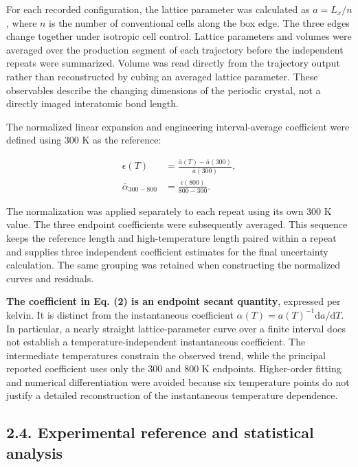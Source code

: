 \documentclass[10pt,a4paper,twocolumn]{article}
\begin{document}
For each recorded configuration, the lattice parameter was calculated as $a=L_x/n$, where $n$ is the number of conventional cells along the box edge. The three edges change together under isotropic cell control. Lattice parameters and volumes were averaged over the production segment of each trajectory before the independent repeats were summarized. Volume was read directly from the trajectory output rather than reconstructed by cubing an averaged lattice parameter. These observables describe the changing dimensions of the periodic crystal, not a directly imaged interatomic bond length.


The normalized linear expansion and engineering interval-average coefficient were defined using 300 K as the reference:


\begin{equation}
\begin{aligned}
\epsilon(T)&=\frac{\bar a(T)-\bar a(300)}{\bar a(300)},\\
\bar\alpha_{300-800}&=\frac{\epsilon(800)}{800-300}.
\end{aligned}\tag{2}
\end{equation}

The normalization was applied separately to each repeat using its own 300 K value. The three endpoint coefficients were subsequently averaged. This sequence keeps the reference length and high-temperature length paired within a repeat and supplies three independent coefficient estimates for the final uncertainty calculation. The same grouping was retained when constructing the normalized curves and residuals.


\textbf{The coefficient in Eq. (2) is an endpoint secant quantity}, expressed per kelvin. It is distinct from the instantaneous coefficient $\alpha(T)=a(T)^{-1}\mathrm{d}a/\mathrm{d}T$. In particular, a nearly straight lattice-parameter curve over a finite interval does not establish a temperature-independent instantaneous coefficient. The intermediate temperatures constrain the observed trend, while the principal reported coefficient uses only the 300 and 800 K endpoints. Higher-order fitting and numerical differentiation were avoided because six temperature points do not justify a detailed reconstruction of the instantaneous temperature dependence.


\subsection*{2.4. Experimental reference and statistical analysis}
\end{document}
